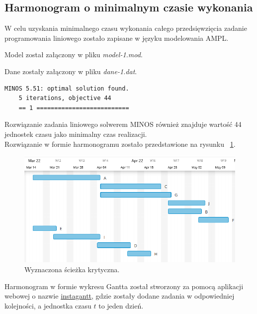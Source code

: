 \documentclass[
    12pt, %
]{../fphw}
\begin{document}
\subsection{Harmonogram o minimalnym czasie wykonania}
W celu uzyskania minimalnego czasu wykonania całego przedsięwzięcia zadanie programowania liniowego
zostało zapisane w języku modelowania AMPL.

Model został załączony w pliku \textit{model-1.mod}.

Dane zostały załączony w pliku \textit{dane-1.dat}.
\begin{lstlisting}[caption=Rozwiązanie znalezione solwerem minos]
    MINOS 5.51: optimal solution found.
    5 iterations, objective 44
    == 1 ==========================
\end{lstlisting}
Rozwiązanie zadania liniowego solwerem MINOS również znajduje wartość 44 jednostek czasu jako minimalny czas realizacji.
\\
Rozwiązanie w formie harmonogramu zostało przedstawione na rysunku ~\ref{fig:harmonogram}.
\begin{figure}[H]
    \centering
    \includegraphics[width=0.9\linewidth]{./img/harmonogram.PNG}
    \caption{Wyznaczona ścieżka krytyczna.}
    \label{fig:harmonogram}
\end{figure}
Harmonogram w formie wykresu Gantta został stworzony za pomocą aplikacji webowej o nazwie
\href{https://app.instagantt.com/}{instagantt}, gdzie zostały dodane zadania
w odpowiedniej kolejności, a jednostka czasu \(t\) to jeden dzień.
\end{document}
